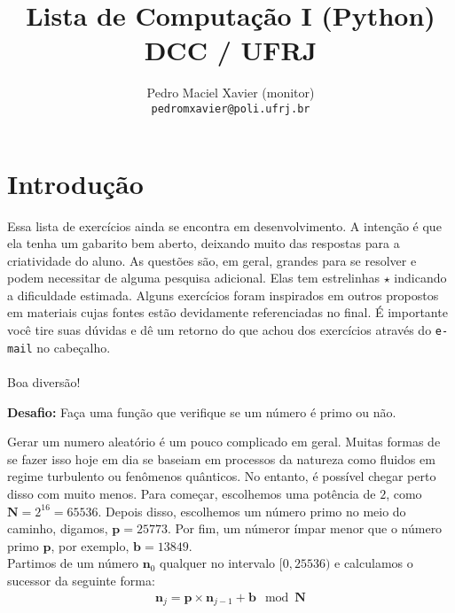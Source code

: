\documentclass[12pt]{article}
\title{Lista de Computação I (Python) \\ {\normalsize DCC / UFRJ}}
\author{Pedro Maciel Xavier (monitor)\\ \texttt{pedromxavier@poli.ufrj.br}}
\begin{document}
	\maketitle
	\section*{Introdução}
	Essa lista de exercícios ainda se encontra em desenvolvimento. A intenção é que ela tenha um gabarito bem aberto, deixando muito das respostas para a criatividade do aluno. As questões são, em geral, grandes para se resolver e podem necessitar de alguma pesquisa adicional. Elas tem estrelinhas $\star$ indicando a dificuldade estimada. Alguns exercícios foram inspirados em outros propostos em materiais cujas fontes estão devidamente referenciadas no final. É importante você tire suas dúvidas e dê um retorno do que achou dos exercícios através do \texttt{e-mail} no cabeçalho.
	~\\
	~\\
	Boa diversão! \par
	\pagebreak
	
	
	\tableofcontents
	
	

	
	\textbf{Desafio:} Faça uma função que verifique se um número é primo ou não.

	
	Gerar um numero aleatório é um pouco complicado em geral. Muitas formas de se fazer isso hoje em dia se baseiam em processos da natureza como fluidos em regime turbulento ou fenômenos quânticos. No entanto, é possível chegar perto disso com muito menos. Para começar, escolhemos uma potência de $2$, como $\mathbf{N} = 2^{16} = 65536$. Depois disso, escolhemos um número primo no meio do caminho, digamos, $\mathbf{p} = 25773$. Por fim, um númeror ímpar menor que o número primo $\mathbf{p}$, por exemplo, $\mathbf{b} = 13849$.\\

	Partimos de um número $\mathbf{n}_0$ qualquer no intervalo $[0, 25536)$ e calculamos o sucessor da seguinte forma:
		\begin{align*}
			\mathbf{n}_j = \mathbf{p} \times \mathbf{n}_{j-1} + \mathbf{b} \mod \mathbf{N}
		\end{align*}
\end{document}
